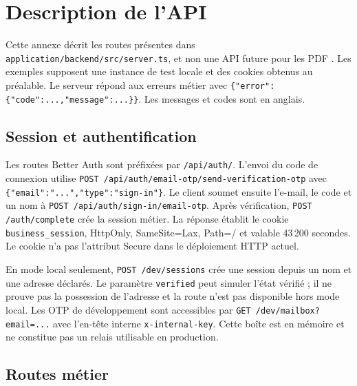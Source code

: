 \chapter{Description de l'API}
\label{ann:api}

Cette annexe décrit les routes présentes dans \texttt{application/backend/src/server.ts}, et non une API future pour les PDF \cite{aws-local-artifacts}. Les exemples supposent une instance de test locale et des cookies obtenus au préalable. Le serveur répond aux erreurs métier avec \texttt{\{"error":\{"code":...,"message":...\}\}}. Les messages et codes sont en anglais.

\section{Session et authentification}

Les routes Better Auth sont préfixées par \texttt{/api/auth/}. L'envoi du code de connexion utilise \texttt{POST /api/auth/email-otp/send-verification-otp} avec \texttt{\{"email":"...","type":"sign-in"\}}. Le client soumet ensuite l'e-mail, le code et un nom à \texttt{POST /api/auth/sign-in/email-otp}. Après vérification, \texttt{POST /auth/complete} crée la session métier. La réponse établit le cookie \texttt{business\_session}, HttpOnly, SameSite=Lax, Path=/ et valable 43\,200 secondes. Le cookie n'a pas l'attribut Secure dans le déploiement HTTP actuel.

En mode local seulement, \texttt{POST /dev/sessions} crée une session depuis un nom et une adresse déclarés. Le paramètre \texttt{verified} peut simuler l'état vérifié ; il ne prouve pas la possession de l'adresse et la route n'est pas disponible hors mode local. Les OTP de développement sont accessibles par \texttt{GET /dev/mailbox?email=...} avec l'en-tête interne \texttt{x-internal-key}. Cette boîte est en mémoire et ne constitue pas un relais utilisable en production.

\section{Routes métier}

